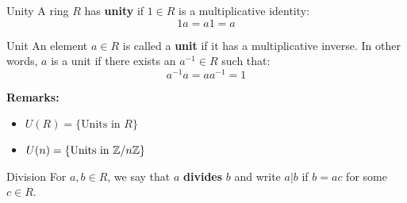 \documentclass[letterpaper]{article}
\begin{document}
\begin{definition}{Unity}{}
    A ring $R$ has \textbf{unity} if $1 \in R$ is a multiplicative identity: 
    \[1a = a1 = a\]
\end{definition}

\begin{definition}{Unit}{}
    An element $a \in R$ is called a \textbf{unit} if it has a multiplicative inverse. In other words, $a$ is a unit if there exists an $a^{-1} \in R$ such that: 
    \[a^{-1}a = aa^{-1} = 1\]
\end{definition}
\textbf{Remarks:}
\begin{itemize}
    \item $U(R) = \{\text{Units in } R\}$
    \item $U(n) = \{\text{Units in } \mathbb{Z} / n\mathbb{Z}\}$
\end{itemize}

\begin{definition}{Division}{}
    For $a, b \in R$, we say that $a$ \textbf{divides} $b$ and write $a | b$ if $b = ac$ for some $c \in R$.
\end{definition}
\end{document}
